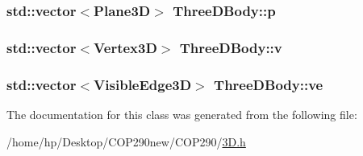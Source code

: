 \subsubsection[{\texorpdfstring{p}{p}}]{\setlength{\rightskip}{0pt plus 5cm}std\+::vector$<${\bf Plane3D}$>$ Three\+D\+Body\+::p}\hypertarget{class_three_d_body_a871bc38d1590dfb2f076a8ca2def89ad}{}\label{class_three_d_body_a871bc38d1590dfb2f076a8ca2def89ad}
\subsubsection[{\texorpdfstring{v}{v}}]{\setlength{\rightskip}{0pt plus 5cm}std\+::vector$<${\bf Vertex3D}$>$ Three\+D\+Body\+::v}\hypertarget{class_three_d_body_ae85a9587eced34b16806c2c2f009d208}{}\label{class_three_d_body_ae85a9587eced34b16806c2c2f009d208}
\subsubsection[{\texorpdfstring{ve}{ve}}]{\setlength{\rightskip}{0pt plus 5cm}std\+::vector$<${\bf Visible\+Edge3D}$>$ Three\+D\+Body\+::ve}\hypertarget{class_three_d_body_ab35d0ee77c7176e3133a9d3357d173e2}{}\label{class_three_d_body_ab35d0ee77c7176e3133a9d3357d173e2}


The documentation for this class was generated from the following file\+:\begin{DoxyCompactItemize}
\item 
/home/hp/\+Desktop/\+C\+O\+P290new/\+C\+O\+P290/\hyperlink{3_d_8h}{3\+D.\+h}\end{DoxyCompactItemize}
